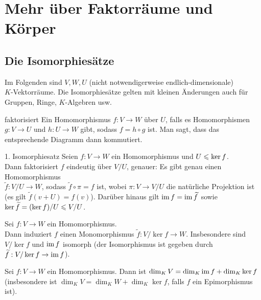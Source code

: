 \chapter{%
    Mehr über Faktorräume und Körper%
}

\section{%
    Die Isomorphiesätze%
}

\begin{Bem}
    Im Folgenden sind $V, W, U$ (nicht notwendigerweise endlich-dimensionale)\\
    $K$-Vektorräume.
    Die Isomorphiesätze gelten mit kleinen Änderungen auch für
    Gruppen, Ringe, $K$-Algebren usw.
\end{Bem}

\begin{Def}{faktorisiert}
    Ein Homomorphismus $f: V \rightarrow W$  über $U$,
    falls es Homomorphismen $g: V \rightarrow U$ und $h: U \rightarrow W$
    gibt, sodass $f = h \circ g$ ist.
    Man sagt, dass das entsprechende Diagramm dann kommutiert.
\end{Def}

\begin{Satz}{1. Isomorphiesatz}
    Seien $f: V \rightarrow W$ ein Homomorphismus und $U \leqslant \ker f$. \\
    Dann faktorisiert $f$ eindeutig über $V/U$, genauer:
    Es gibt genau einen Homomorphismus \\
    $\widetilde{f}: V/U \rightarrow W$,
    sodass $\widetilde{f} \circ \pi = f$ ist, wobei $\pi: V \rightarrow V/U$
    die natürliche Projektion ist
    (es gilt $\widetilde{f}(v + U) = f(v)$).
    Darüber hinaus gilt $\operatorname{im} f = \operatorname{im} \widetilde{f}$
    sowie $\ker \widetilde{f} = (\ker f)/U \leqslant V/U$.
\end{Satz}

\begin{Kor}
    Sei $f: V \rightarrow W$ ein Homomorphismus. \\
    Dann induziert $f$ einen Monomorphismus
    $\widetilde{f}: V/\ker f \rightarrow W$.
    Insbesondere sind $V/\ker f$ und $\operatorname{im} f$ isomorph (der Isomorphismus
    ist gegeben durch $\widetilde{f}: V/\ker f \rightarrow \operatorname{im} f$).
\end{Kor}

\begin{Kor}
    Sei $f: V \rightarrow W$ ein Homomorphismus.
    Dann ist $\dim_K V = \dim_K \operatorname{im} f + \dim_K \ker f$
    (insbesondere ist $\dim_K V = \dim_K W + \dim_K \ker f$, falls $f$ ein
    Epimorphismus ist).
\end{Kor}

